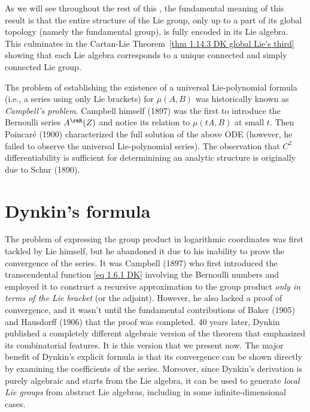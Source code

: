 \begin{rem}
    As we will see throughout the rest of this \chap, the fundamental meaning of this result is that the entire structure of the Lie group, only up to a part of its global topology (namely the fundamental group), is fully encoded in its Lie algebra. This culminates in the Cartan-Lie Theorem~\ref{thm 1.14.3 DK global Lie's third} showing that each Lie algebra corresponds to a unique connected and simply connected Lie group.
\end{rem}


\begin{hrem*}
    The problem of establishing the existence of a universal Lie-polynomial formula (i.e.,  a series using only Lie brackets) for $\mu(A,B)$ was historically known as \emph{Campbell's problem}. Campbell himself (1897) was the first to introduce the Bernoulli series $A^\rmR(Z)$ and notice its relation to $\mu(tA,B)$ at small $t$. Then Poincar\'e (1900) characterized the full solution of the above ODE (however, he failed to observe the universal Lie-polynomial series). The observation that $C^2$ differentiability is sufficient for determinining an analytic structure is originally due to Schur (1890).
\end{hrem*}





\section{Dynkin's formula}

\begin{hrem*}
    The problem of expressing the group product in logarithmic coordinates was first tackled by Lie himself, but he abandoned it due to his inability to prove the convergence of the series. It was Campbell (1897) who first introduced the transcendental function \eqref{eq 1.6.1 DK} involving the Bernoulli numbers and employed it to construct a recursive approximation to the group product \emph{only in terms of the Lie bracket} (or the adjoint). However, he also lacked a proof of convergence, and it wasn't until the fundamental contributions of Baker (1905) and Hausdorff (1906) that the proof was completed. 40 years later, Dynkin published a completely different algebraic version of the theorem that emphasized its combinatorial features. It is this version that we present now. The major benefit of Dynkin's explicit formula is that its convergence can be shown directly by examining the coefficients of the series. Moreover, since Dynkin's derivation is purely algebraic and starts from the Lie algebra, it can be used to generate \emph{local Lie groups} from abstract Lie algebras, including in some infinite-dimensional cases.
\end{hrem*}

